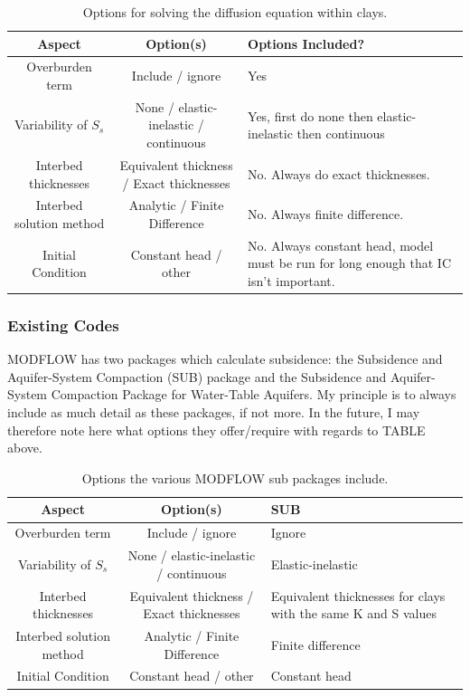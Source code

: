 \documentclass{article}
\begin{document}
\begin{table}[h]
\centering
\begin{tabular}{|c|c|p{4cm}|} 
\hline
\textbf{Aspect} & \textbf{Option(s)} & \textbf{Options Included?} \\ 
\hline
Overburden term & Include / ignore & Yes\\
Variability of $S_s$ & None / elastic-inelastic / continuous & Yes, first do none then elastic-inelastic then continuous \\
Interbed thicknesses & Equivalent thickness / Exact thicknesses  & No. Always do exact thicknesses.\\
Interbed solution method & Analytic / Finite Difference & No. Always finite difference.  \\
Initial Condition & Constant head / other & No. Always constant head, model must be run for long enough that IC isn't important. \\ 
\hline 
\end{tabular}
\caption{Options for solving the diffusion equation within clays.}
\label{table:diffn-options}
\end{table}


\subsubsection{Existing Codes}

MODFLOW has two packages which calculate subsidence: the Subsidence and Aquifer-System Compaction (SUB) package and the Subsidence and Aquifer-System Compaction Package for Water-Table Aquifers. My principle is to always include as much detail as these packages, if not more. In the future, I may therefore note here what options they offer/require with regards to TABLE above.

\begin{table}[h]
\centering
\begin{tabular}{|c|c|p{4cm}|} 
\hline
\textbf{Aspect} & \textbf{Option(s)} & \textbf{SUB} \\ 
\hline
Overburden term & Include / ignore & Ignore \\
Variability of $S_s$ & None / elastic-inelastic / continuous & Elastic-inelastic  \\
Interbed thicknesses & Equivalent thickness / Exact thicknesses & Equivalent thicknesses for clays with the same K and S values \\
Interbed solution method & Analytic / Finite Difference & Finite difference \\
Initial Condition & Constant head / other & Constant head \\ 
\hline 
\end{tabular}
\caption{Options the various MODFLOW sub packages include.}
\label{table:diffn-options}
\end{table}
\end{document}
